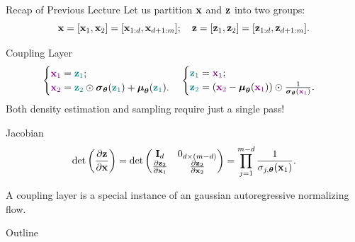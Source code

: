 \documentclass{beamer}
\begin{document}
\begin{frame}{Recap of Previous Lecture}
	Let us partition $\mathbf{x}$ and $\mathbf{z}$ into two groups: 
	\[
	\mathbf{x} = [\mathbf{x}_1, \mathbf{x}_2] = [\mathbf{x}_{1:d}, \mathbf{x}_{d+1:m}]; \quad \mathbf{z} = [\mathbf{z}_1, \mathbf{z}_2] = [\mathbf{z}_{1:d}, \mathbf{z}_{d+1:m}].
	\]
	\vspace{-0.5cm}
	\begin{block}{Coupling Layer}
		\vspace{-0.5cm}
		\[
		\begin{cases} {\color{violet}\mathbf{x}_1} = {\color{teal}\mathbf{z}_1}; \\ {\color{violet}\mathbf{x}_2} = {\color{teal}\mathbf{z}_2} \odot \boldsymbol{\sigma}_{\boldsymbol{\theta}}({\color{teal}\mathbf{z}_1}) + \boldsymbol{\mu}_{\boldsymbol{\theta}}({\color{teal}\mathbf{z}_1}).\end{cases}  
		\begin{cases} {\color{teal}\mathbf{z}_1} ={\color{violet} \mathbf{x}_1}; \\ {\color{teal}\mathbf{z}_2} = \left({\color{violet}\mathbf{x}_2} - \boldsymbol{\mu}_{\boldsymbol{\theta}}({\color{violet}\mathbf{x}_1}) \right) \odot \frac{1}{\boldsymbol{\sigma}_{\boldsymbol{\theta}}({\color{violet}\mathbf{x}_1})}.\end{cases}
		\]
		Both density estimation and sampling require just a single pass!
	\end{block}
	\begin{block}{Jacobian}
		\vspace{-0.3cm}
		\[
		\det \left( \frac{\partial \mathbf{z}}{\partial \mathbf{x}} \right) = \det 
		\begin{pmatrix}
			\mathbf{I}_d & 0_{d \times (m - d)} \\
			\frac{\partial \mathbf{z}_2}{\partial \mathbf{x}_1} & \frac{\partial \mathbf{z}_2}{\partial \mathbf{x}_2}
		\end{pmatrix} = \prod_{j=1}^{m - d} \frac{1}{\sigma_{j, \boldsymbol{\theta}}(\mathbf{x}_1)}.
		\]
	\end{block}
	A coupling layer is a special instance of an gaussian autoregressive normalizing flow.
	
\end{frame}
\begin{frame}{Outline}
    \tableofcontents
\end{frame}
\end{document}
